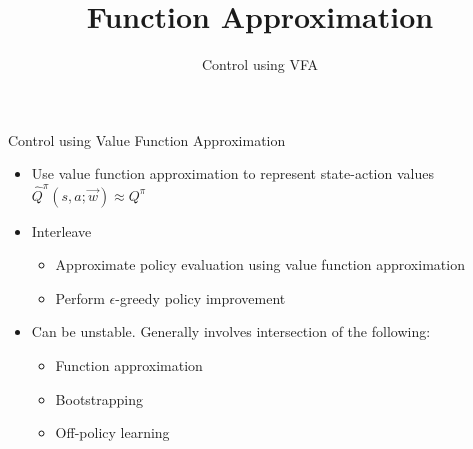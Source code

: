 


\title[Reinforcement Learning: Function Approximation]{Function Approximation}
\subtitle{Control using VFA}



	
	\maketitle

\begin{frame}[c]{Control using Value Function Approximation}
	
	\begin{itemize}
		\item Use value function approximation to represent state-action values $\hat{Q}^\pi(s,a;\vec{w}) \approx Q^\pi$
		\item Interleave
		\begin{itemize}
			\item Approximate policy evaluation using value function approximation
			\item Perform $\epsilon$-greedy policy improvement
		\end{itemize}
		\item Can be unstable. Generally involves intersection of the following:
		\begin{itemize}
			\item Function approximation
			\item Bootstrapping
			\item \alert{Off-policy learning}
		\end{itemize}
	\end{itemize}

\end{frame}
